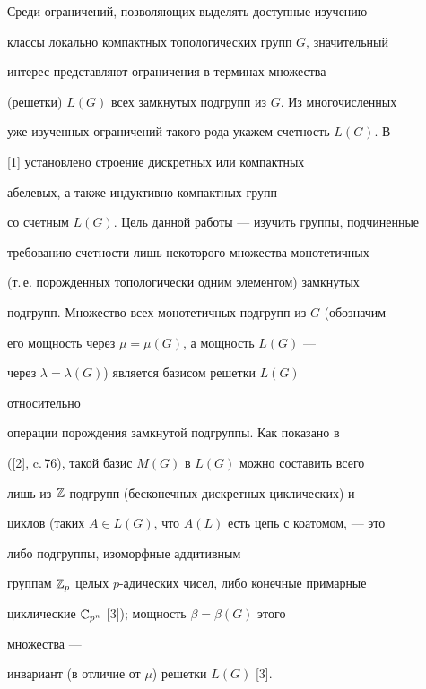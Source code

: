 \maketitle 


\label{begin} 


 


 


Среди ограничений, позволяющих выделять доступные изучению 


классы локально компактных топологических групп $G$, значительный 


интерес представляют ограничения в терминах множества 


(решетки) $L(G)$ всех замкнутых подгрупп из $G$. Из многочисленных 


уже изученных ограничений такого рода укажем счетность $L(G)$. В 


[1] установлено строение дискретных или компактных 


абелевых, а также индуктивно компактных групп 


со счетным $L(G)$. Цель данной работы --- изучить группы, подчиненные 


требованию счетности лишь некоторого множества монотетичных 


(т.\,е. порожденных топологически одним элементом) замкнутых 


подгрупп. Множество всех монотетичных подгрупп из $G$ (обозначим 


его мощность через $\mu=\mu(G)$, а мощность $L(G)$ --- 


через $\lambda=\lambda(G)$) является базисом решетки $L(G)$ 


относительно 


операции порождения замкнутой подгруппы. Как показано в 


([2], c.\,76), такой базис $M(G)$ в $L(G)$ можно составить всего  


лишь из $\Bbb Z$-подгрупп (бесконечных дискретных циклических) и  


циклов (таких $A\in L(G)$, что $A(L)$ есть цепь с коатомом, --- это 


либо подгруппы, изоморфные аддитивным 


группам $\Bbb Z_p$ целых $p$-адических чисел, либо конечные примарные 


циклические $\Bbb C_{p^n}$ [3]); мощность $\beta=\beta(G)$ этого 


множества --- 


инвариант (в отличие от $\mu$) решетки $L(G)$ [3]. 



